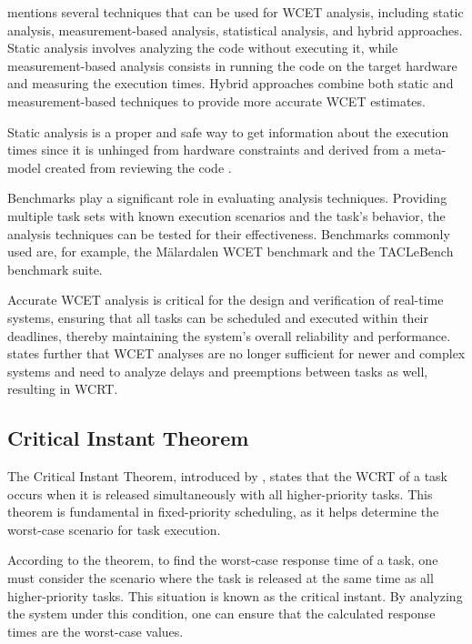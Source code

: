 \textcite{kelterWCETAnalysisOptimization} mentions several techniques that can be used for \ac{WCET} analysis, including static analysis, measurement-based analysis, statistical analysis, and hybrid approaches.
Static analysis involves analyzing the code without executing it, while measurement-based analysis consists in running the code on the target hardware and measuring the execution times.
Hybrid approaches combine both static and measurement-based techniques to provide more accurate \ac{WCET} estimates.

Static analysis is a proper and safe way to get information about the execution times since it is unhinged from hardware constraints and derived from a meta-model created from reviewing the code \cite{kelterWCETAnalysisOptimization}.

Benchmarks play a significant role in evaluating analysis techniques.
Providing multiple task sets with known execution scenarios and the task's behavior, the analysis techniques can be tested for their effectiveness.
Benchmarks commonly used are, for example, the Mälardalen \ac{WCET} benchmark and the TACLeBench benchmark suite\cite{falkTACLeBenchBenchmarkCollection2016}.

Accurate \ac{WCET} analysis is critical for the design and verification of real-time systems, ensuring that all tasks can be scheduled and executed within their deadlines, thereby maintaining the system's overall reliability and performance\cite{kelterWCETAnalysisOptimization}.
\textcite{kelterWCETAnalysisOptimization} states further that \ac{WCET} analyses are no longer sufficient for newer and complex systems and need to analyze delays and preemptions between tasks as well, resulting in \ac{WCRT}.

\subsection{Critical Instant Theorem}\label{sec:critical_instant_theorem}
The Critical Instant Theorem, introduced by \textcite{liuSchedulingAlgorithmsMultiprogramming1973}, states that the \ac{WCRT} of a task occurs when it is released simultaneously with all higher-priority tasks.
This theorem is fundamental in fixed-priority scheduling, as it helps determine the worst-case scenario for task execution.

According to the theorem, to find the worst-case response time of a task, one must consider the scenario where the task is released at the same time as all higher-priority tasks.
This situation is known as the critical instant. By analyzing the system under this condition, one can ensure that the calculated response times are the worst-case values.

